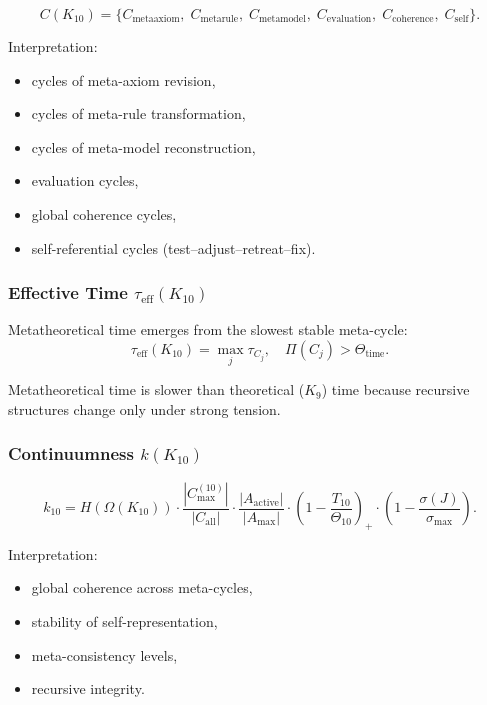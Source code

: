\[
C(K_{10})=
\{
C_{\mathrm{metaaxiom}},\;
C_{\mathrm{metarule}},\;
C_{\mathrm{metamodel}},\;
C_{\mathrm{evaluation}},\;
C_{\mathrm{coherence}},\;
C_{\mathrm{self}}
\}.
\]

Interpretation:
\begin{itemize}
    \item cycles of meta-axiom revision,
    \item cycles of meta-rule transformation,
    \item cycles of meta-model reconstruction,
    \item evaluation cycles,
    \item global coherence cycles,
    \item self-referential cycles (test–adjust–retreat–fix).
\end{itemize}

\subsubsection{Effective Time $\tau_{\mathrm{eff}}(K_{10})$}

Metatheoretical time emerges from the slowest stable meta-cycle:
\[
\tau_{\mathrm{eff}}(K_{10}) = \max_j \tau_{C_j},
\quad
\Pi(C_j) > \Theta_{\mathrm{time}}.
\]

Metatheoretical time is slower than theoretical ($K_9$) time because recursive structures change only under strong tension.

\subsubsection{Continuumness $k(K_{10})$}

\[
k_{10} =
H(\Omega(K_{10}))
\cdot
\frac{|C_{\max}^{(10)}|}{|C_{\mathrm{all}}|}
\cdot
\frac{|A_{\mathrm{active}}|}{|A_{\max}|}
\cdot
\left(1-\frac{T_{10}}{\Theta_{10}}\right)_+
\cdot
\left(1-\frac{\sigma(J)}{\sigma_{\max}}\right).
\]

Interpretation:
\begin{itemize}
    \item global coherence across meta-cycles,
    \item stability of self-representation,
    \item meta-consistency levels,
    \item recursive integrity.
\end{itemize}

